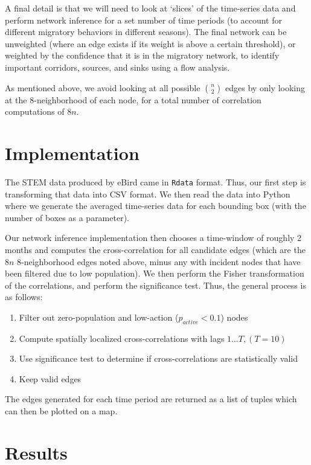\documentclass{article} %
\begin{document}
A final detail is that we will need to look at `slices' of the time-series data and perform network inference for a set number of time periods (to account for different migratory behaviors in different seasons). The final network can be unweighted (where an edge exists if its weight is above a certain threshold), or weighted by the confidence that it is in the migratory network, to identify important corridors, sources, and sinks using a flow analysis. 

As mentioned above, we avoid looking at all possible $n \choose 2$ edges by only looking at the 8-neighborhood of each node, for a total number of correlation computations of $8n$.

\section{Implementation}
The STEM data produced by eBird came in \texttt{Rdata} format. Thus, our first step is transforming that data into CSV format. We then read the data into Python where we generate the averaged time-series data for each bounding box (with the number of boxes as a parameter). 

Our network inference implementation then chooses a time-window of roughly 2 months and computes the cross-correlation for all candidate edges (which are the $8n$ 8-neighborhood edges noted above, minus any with incident nodes that have been filtered due to low population). We then perform the Fisher transformation of the correlations, and perform the significance test. Thus, the general process is as follows:

\begin{enumerate}
\item Filter out zero-population and low-action ($p_{active} < 0.1$) nodes
\item Compute spatially localized cross-correlations with lags $1\dots T, (T=10)$
\item Use significance test to determine if cross-correlations are statistically valid
\item Keep valid edges
\end{enumerate}

The edges generated for each time period are returned as a list of tuples which can then be plotted on a map.

\section{Results}
\end{document}
